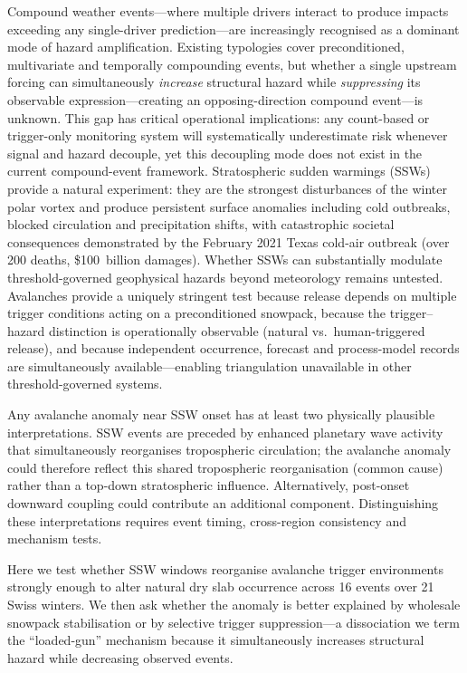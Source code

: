 \documentclass[11pt,letterpaper]{article}
\begin{document}
Compound weather events---where multiple drivers interact to produce impacts exceeding any single-driver prediction---are increasingly recognised as a dominant mode of hazard amplification\cite{Zscheischler2020,Leonard2014}. Existing typologies cover preconditioned, multivariate and temporally compounding events, but whether a single upstream forcing can simultaneously \emph{increase} structural hazard while \emph{suppressing} its observable expression---creating an opposing-direction compound event---is unknown. This gap has critical operational implications: any count-based or trigger-only monitoring system will systematically underestimate risk whenever signal and hazard decouple, yet this decoupling mode does not exist in the current compound-event framework. Stratospheric sudden warmings (SSWs) provide a natural experiment: they are the strongest disturbances of the winter polar vortex and produce persistent surface anomalies including cold outbreaks, blocked circulation and precipitation shifts\cite{Matsuno1971,Baldwin2001,Kidston2015}, with catastrophic societal consequences demonstrated by the February 2021 Texas cold-air outbreak (over 200 deaths, \$100~billion damages\cite{Cohen2021}). Whether SSWs can substantially modulate threshold-governed geophysical hazards beyond meteorology remains untested. Avalanches provide a uniquely stringent test because release depends on multiple trigger conditions acting on a preconditioned snowpack\cite{Schweizer2003}, because the trigger--hazard distinction is operationally observable (natural vs.\ human-triggered release), and because independent occurrence, forecast and process-model records are simultaneously available\cite{Reuter2018}---enabling triangulation unavailable in other threshold-governed systems.

Any avalanche anomaly near SSW onset has at least two physically plausible interpretations. SSW events are preceded by enhanced planetary wave activity\cite{Polvani2004} that simultaneously reorganises tropospheric circulation; the avalanche anomaly could therefore reflect this shared tropospheric reorganisation (common cause) rather than a top-down stratospheric influence. Alternatively, post-onset downward coupling could contribute an additional component. Distinguishing these interpretations requires event timing, cross-region consistency and mechanism tests.

Here we test whether SSW windows reorganise avalanche trigger environments strongly enough to alter natural dry slab occurrence across 16 events over 21 Swiss winters. We then ask whether the anomaly is better explained by wholesale snowpack stabilisation or by selective trigger suppression---a dissociation we term the ``loaded-gun'' mechanism because it simultaneously increases structural hazard while decreasing observed events.
\end{document}
